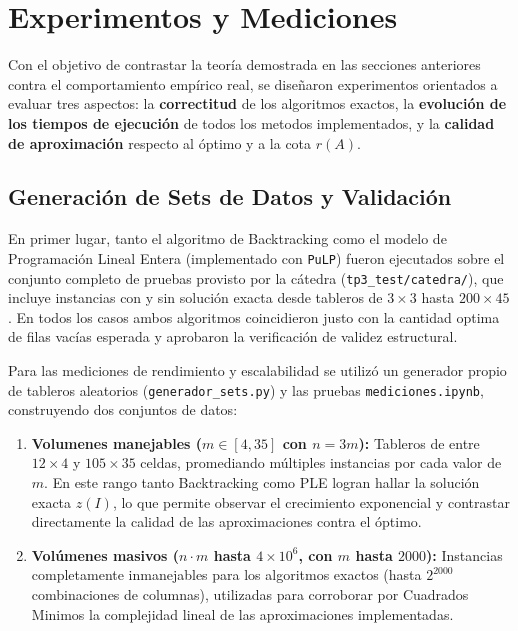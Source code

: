 \section{Experimentos y Mediciones}

Con el objetivo de contrastar la teoría demostrada en las secciones anteriores contra el comportamiento empírico real, se diseñaron experimentos orientados a evaluar tres aspectos: la \textbf{correctitud} de los algoritmos exactos, la \textbf{evolución de los tiempos de ejecución} de todos los metodos implementados, y la \textbf{calidad de aproximación} respecto al óptimo y a la cota $r(A)$.

\subsection{Generación de Sets de Datos y Validación}

En primer lugar, tanto el algoritmo de Backtracking como el modelo de Programación Lineal Entera (implementado con \texttt{PuLP}) fueron ejecutados sobre el conjunto completo de pruebas provisto por la cátedra (\texttt{tp3\_test/catedra/}), que incluye instancias con y sin solución exacta desde tableros de $3 \times 3$ hasta $200 \times 45$. En todos los casos ambos algoritmos coincidieron justo con la cantidad optima de filas vacías esperada y aprobaron la verificación de validez estructural.

Para las mediciones de rendimiento y escalabilidad se utilizó un generador propio de tableros aleatorios (\texttt{generador\_sets.py}) y las pruebas \texttt{mediciones.ipynb}, construyendo dos conjuntos de datos:
\begin{enumerate}
    \item \textbf{Volumenes manejables ($m \in [4, 35]$ con $n = 3m$):} Tableros de entre $12 \times 4$ y $105 \times 35$ celdas, promediando múltiples instancias por cada valor de $m$. En este rango tanto Backtracking como PLE logran hallar la solución exacta $z(I)$, lo que permite observar el crecimiento exponencial y contrastar directamente la calidad de las aproximaciones contra el óptimo.
    \item \textbf{Volúmenes masivos ($n \cdot m$ hasta $4 \times 10^6$, con $m$ hasta $2000$):} Instancias completamente inmanejables para los algoritmos exactos (hasta $2^{2000}$ combinaciones de columnas), utilizadas para corroborar por Cuadrados Minimos la complejidad lineal de las aproximaciones implementadas.
\end{enumerate}

